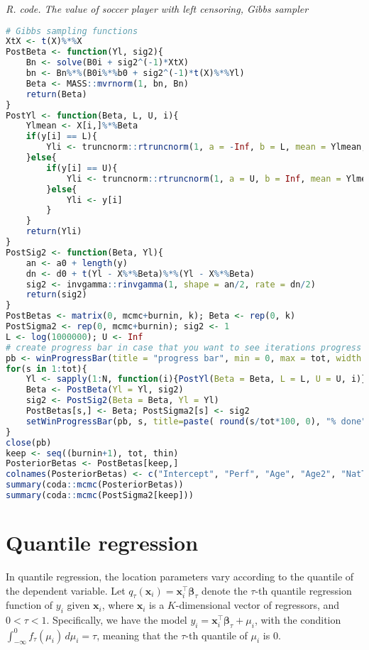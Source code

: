 \begin{tcolorbox}[enhanced,width=4.67in,center upper,
	fontupper=\large\bfseries,drop shadow southwest,sharp corners]
	\textit{R. code. The value of soccer player with left censoring, Gibbs sampler}
	\begin{VF}
		\begin{lstlisting}[language=R]
# Gibbs sampling functions
XtX <- t(X)%*%X
PostBeta <- function(Yl, sig2){
	Bn <- solve(B0i + sig2^(-1)*XtX)
	bn <- Bn%*%(B0i%*%b0 + sig2^(-1)*t(X)%*%Yl)
	Beta <- MASS::mvrnorm(1, bn, Bn)
	return(Beta)
}
PostYl <- function(Beta, L, U, i){
	Ylmean <- X[i,]%*%Beta
	if(y[i] == L){
		Yli <- truncnorm::rtruncnorm(1, a = -Inf, b = L, mean = Ylmean, sd = sig2^0.5)
	}else{
		if(y[i] == U){
			Yli <- truncnorm::rtruncnorm(1, a = U, b = Inf, mean = Ylmean, sd = sig2^0.5)
		}else{
			Yli <- y[i]
		}
	}
	return(Yli)
}
PostSig2 <- function(Beta, Yl){
	an <- a0 + length(y)
	dn <- d0 + t(Yl - X%*%Beta)%*%(Yl - X%*%Beta)
	sig2 <- invgamma::rinvgamma(1, shape = an/2, rate = dn/2)
	return(sig2)
}
PostBetas <- matrix(0, mcmc+burnin, k); Beta <- rep(0, k)
PostSigma2 <- rep(0, mcmc+burnin); sig2 <- 1
L <- log(1000000); U <- Inf
# create progress bar in case that you want to see iterations progress
pb <- winProgressBar(title = "progress bar", min = 0, max = tot, width = 300)
for(s in 1:tot){
	Yl <- sapply(1:N, function(i){PostYl(Beta = Beta, L = L, U = U, i)})
	Beta <- PostBeta(Yl = Yl, sig2)
	sig2 <- PostSig2(Beta = Beta, Yl = Yl) 
	PostBetas[s,] <- Beta; PostSigma2[s] <- sig2
	setWinProgressBar(pb, s, title=paste( round(s/tot*100, 0), "% done"))
}
close(pb)
keep <- seq((burnin+1), tot, thin)
PosteriorBetas <- PostBetas[keep,]
colnames(PosteriorBetas) <- c("Intercept", "Perf", "Age", "Age2", "NatTeam", "Goals", "Exp", "Exp2")
summary(coda::mcmc(PosteriorBetas))
summary(coda::mcmc(PostSigma2[keep]))
\end{lstlisting}
	\end{VF}
\end{tcolorbox} 

\section{Quantile regression}\label{sec69}

In quantile regression, the location parameters vary according to the quantile of the dependent variable. Let $q_{\tau}(\bm{x}_i) = \bm{x}_i^{\top} \bm{\beta}_{\tau}$ denote the $\tau$-th quantile regression function of $y_i$ given $\bm{x}_i$, where $\bm x_i$ is a $K$-dimensional vector of regressors, and $0 < \tau < 1$. Specifically, we have the model $y_i = \bm{x}_i^{\top} \bm{\beta}_{\tau} + \mu_i$, with the condition $\int_{-\infty}^{0} f_{\tau}(\mu_i) \, d\mu_i = \tau$, meaning that the $\tau$-th quantile of $\mu_i$ is 0.

